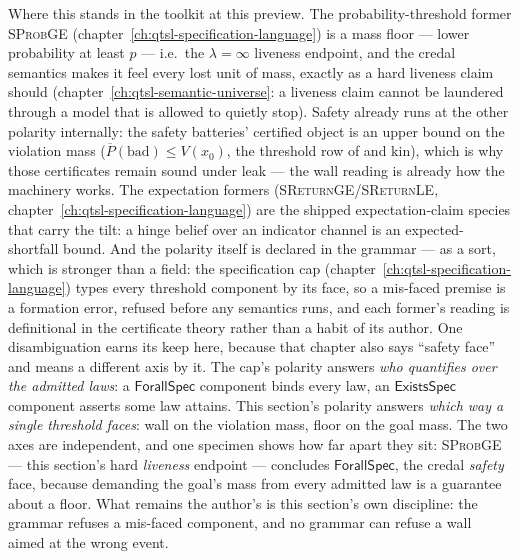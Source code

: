 Where this stands in the toolkit at this preview. The
probability-threshold former \textsc{SProbGE}
(chapter~\ref{ch:qtsl-specification-language}) is a mass floor --- lower
probability at least $p$ --- i.e.\ the $\lambda = \infty$ liveness
endpoint, and the credal semantics makes it feel every lost unit of
mass, exactly as a hard liveness claim should
(chapter~\ref{ch:qtsl-semantic-universe}: a liveness claim cannot be
laundered through a model that is allowed to quietly stop). Safety
already runs at the other polarity internally: the safety batteries' certified
object is an upper bound on the violation mass
($\overline{P}(\mathrm{bad}) \le V(x_0)$, the threshold row of
 and kin), which is why those certificates
remain sound under leak --- the wall reading is already how the
machinery works. The expectation formers
(\textsc{SReturnGE}/\textsc{SReturnLE},
chapter~\ref{ch:qtsl-specification-language}) are the shipped
expectation-claim species that carry the tilt: a hinge belief over an
indicator channel is an expected-shortfall bound. And the polarity
itself is declared in the grammar --- as a sort, which is stronger
than a field: the specification cap
(chapter~\ref{ch:qtsl-specification-language}) types every threshold
component by its face, so a mis-faced premise is a formation error,
refused before any semantics runs, and each former's reading is
definitional in the certificate theory rather than a habit of its
author. One disambiguation earns its keep here, because that chapter
also says ``safety face'' and means a different axis by it. The cap's
polarity answers \emph{who quantifies over the admitted laws}: a
$\mathsf{ForallSpec}$ component binds every law, an
$\mathsf{ExistsSpec}$ component asserts some law attains. This
section's polarity answers \emph{which way a single threshold faces}:
wall on the violation mass, floor on the goal mass. The two axes are
independent, and one specimen shows how far apart they sit:
\textsc{SProbGE} --- this section's hard \emph{liveness} endpoint ---
concludes $\mathsf{ForallSpec}$, the credal \emph{safety} face,
because demanding the goal's mass from every admitted law is a
guarantee about a floor. What remains the author's is this section's
own discipline: the grammar refuses a mis-faced component, and no
grammar can refuse a wall aimed at the wrong event.

